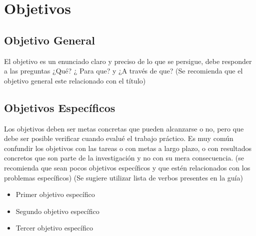 \chapter{Objetivos}
\section{Objetivo General}
El objetivo es un enunciado claro y preciso de lo que se persigue, debe responder a las preguntas ¿Qué? ¿ Para que? y ¿A través de que? (Se recomienda que el objetivo general este relacionado con el título)

\section{Objetivos Específicos}
Los objetivos deben ser metas concretas que pueden alcanzarse o no, pero que debe ser posible verificar cuando evalué el trabajo práctico. Es muy común confundir los objetivos con las tareas o con metas a largo plazo, o con resultados concretos que son parte de la investigación y no con su mera consecuencia.
(se recomienda que sean pocos objetivos específicos y que estén relacionados con los problemas específicos) (Se sugiere utilizar lista de verbos presentes en la guía)

 \begin{itemize}
	\item Primer objetivo específico
	\item Segundo objetivo específico
	\item Tercer objetivo específico
 \end{itemize}